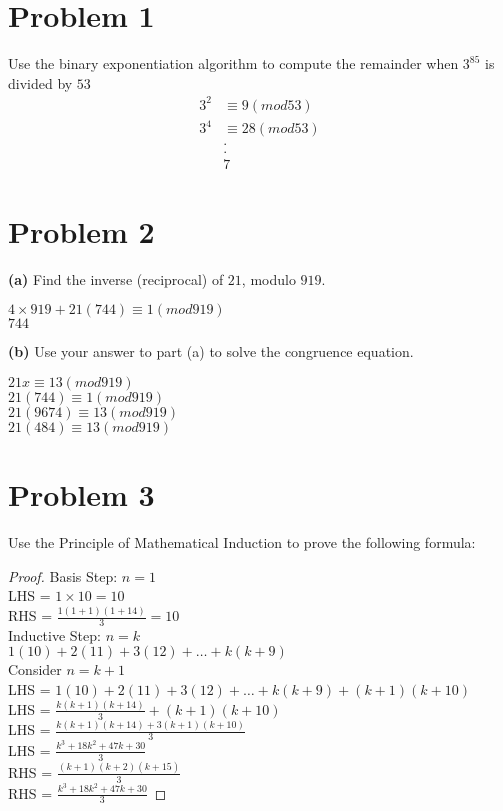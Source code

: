 \documentclass{article}
\newenvironment{problem}[1]{
  \nobreak\section*{Problem #1}
}{}
\begin{document}
  \begin{problem}{1}
    Use the binary exponentiation algorithm to compute the remainder when $3^{85}$ is divided by $53$
    \begin{equation*}
      \begin{split}
        3^{2} & \equiv 9 (mod 53)\\
        3^{4} & \equiv 28 (mod 53)\\
        & .\\
        & .\\
        & 7
      \end{split}
    \end{equation*}
  \end{problem}

  \begin{problem}{2}
    \textbf{(a)} Find the inverse (reciprocal) of $21$, modulo $919$.
    \begin{center}
      $4 \times 919 + 21(744) \equiv 1 (mod 919)$\\
      $744$
    \end{center}
    \textbf{(b)} Use your answer to part (a) to solve the congruence equation.
    \begin{center}
      $21x \equiv 13 (mod 919)$\\
      $21(744) \equiv 1 (mod 919)$\\
      $21(9674) \equiv 13 (mod 919)$\\
      $21(484) \equiv 13 (mod 919)$
    \end{center}
  \end{problem}

  \begin{problem}{3}
    Use the Principle of Mathematical Induction to prove the following formula:
    \begin{proof}
      Basis Step: $n = 1$\\
      LHS = $1 \times 10 = 10$\\
      RHS = $\frac{1(1 + 1)(1 + 14)}{3} = 10$\\
      Inductive Step: $n = k$\\
      $1(10) + 2(11) + 3(12) + \dots + k(k + 9)$\\
      Consider $n = k + 1$\\
      LHS = $1(10) + 2(11) + 3(12) + \dots + k(k + 9) + (k + 1)(k + 10)$\\
      LHS = $\frac{k(k + 1)(k + 14)}{3} + (k + 1)(k + 10)$\\
      LHS = $\frac{k(k + 1)(k + 14) + 3(k + 1)(k + 10)}{3}$\\
      LHS = $\frac{k^3 + 18k^2 + 47k + 30}{3}$\\
      RHS = $\frac{(k+1)(k+2)(k+15)}{3}$\\
      RHS = $\frac{k^3 + 18k^2 + 47k + 30}{3}$
    \end{proof}
  \end{problem}
\end{document}
